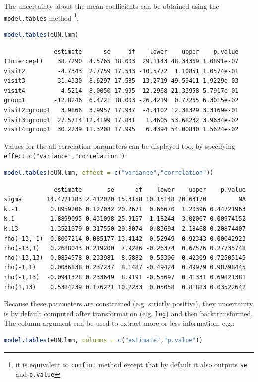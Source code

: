 \documentclass[12pt]{article}
\begin{document}
The uncertainty about the mean coefficients can be obtained using the
\texttt{model.tables} method \footnote{it is equivalent to \texttt{confint} method
except that by default it also outputs \texttt{se} and \texttt{p.value}}:
\begin{lstlisting}[language=r,numbers=none]
model.tables(eUN.lmm)
\end{lstlisting}

\label{}
\begin{verbatim}
              estimate      se     df    lower    upper    p.value
(Intercept)    38.7290  4.5765 18.003  29.1143 48.34369 1.0891e-07
visit2         -4.7343  2.7759 17.543 -10.5772  1.10851 1.0574e-01
visit3         31.4330  8.6297 17.585  13.2719 49.59411 1.9229e-03
visit4          4.5214  8.0050 17.995 -12.2968 21.33958 5.7917e-01
group1        -12.8246  6.4721 18.003 -26.4219  0.77265 6.3015e-02
visit2:group1   3.9866  3.9957 17.937  -4.4102 12.38329 3.3169e-01
visit3:group1  27.5714 12.4199 17.831   1.4605 53.68232 3.9634e-02
visit4:group1  30.2239 11.3208 17.995   6.4394 54.00840 1.5624e-02
\end{verbatim}


Values for the all correlation parameters can be displayed
too, by specifying \texttt{effect=c("variance","correlation")}:
\begin{lstlisting}[language=r,numbers=none]
model.tables(eUN.lmm, effect = c("variance","correlation"))
\end{lstlisting}

\label{}
\begin{verbatim}
              estimate       se      df    lower    upper    p.value
sigma       14.4721183 2.412020 15.3158 10.15148 20.63170         NA
k.-1         0.8959206 0.127032 20.2671  0.66670  1.20396 0.44721963
k.1          1.8899095 0.431098 25.9157  1.18244  3.02067 0.00974152
k.13         1.3521979 0.317550 29.8074  0.83694  2.18468 0.20874407
rho(-13,-1)  0.8007214 0.085177 13.4142  0.52949  0.92343 0.00042923
rho(-13,1)   0.2688043 0.219200  7.9286 -0.26374  0.67576 0.27735748
rho(-13,13) -0.0854578 0.233981  8.5882 -0.55306  0.42309 0.72505145
rho(-1,1)    0.0036838 0.237237  8.1487 -0.49424  0.49979 0.98798445
rho(-1,13)  -0.0941328 0.233649  8.9191 -0.55697  0.41331 0.69821381
rho(1,13)    0.5384239 0.176221 10.2233  0.05058  0.81883 0.03522642
\end{verbatim}

Because these parameters are constrained (e.g. strictly positive),
they uncertainty is by default computed after transformation
(e.g. \texttt{log}) and then backtransformed. The column argument can be used
to extract more or less information, e.g.:
\begin{lstlisting}[language=r,numbers=none]
model.tables(eUN.lmm, columns = c("estimate","p.value"))
\end{lstlisting}
\end{document}
